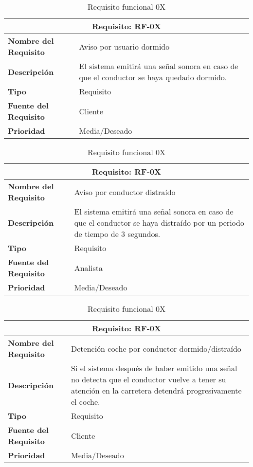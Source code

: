 \begin{table}[H]
\begin{center}
\begin{tabular}{p{} p{7cm}}
\multicolumn{2}{c}{\textbf{Requisito: RF-0X} } \\
\hline \hline
\textbf{Nombre del Requisito} & Aviso por usuario dormido\\
\hline
\textbf{Descripción} & El sistema emitirá una señal sonora en caso de que el conductor se haya quedado dormido.\\
\hline
\textbf{Tipo} & Requisito  \\
\hline
\textbf{Fuente del Requisito} & Cliente  \\
\hline
\textbf{Prioridad} & Media/Deseado  \\ \hline
\end{tabular}
\caption{Requisito funcional 0X}
\label{tab:personal}
\end{center}
\end{table}

\begin{table}[H]
\begin{center}
\begin{tabular}{p{} p{7cm}}
\multicolumn{2}{c}{\textbf{Requisito: RF-0X} } \\
\hline \hline
\textbf{Nombre del Requisito} & Aviso por conductor distraído\\
\hline
\textbf{Descripción} & El sistema emitirá una señal sonora en caso de que el conductor se haya distraído por un periodo de tiempo de 3 segundos.\\
\hline
\textbf{Tipo} & Requisito  \\
\hline
\textbf{Fuente del Requisito} & Analista  \\
\hline
\textbf{Prioridad} & Media/Deseado  \\ \hline
\end{tabular}
\caption{Requisito funcional 0X}
\label{tab:personal}
\end{center}
\end{table}

\begin{table}[H]
\begin{center}
\begin{tabular}{p{} p{7cm}}
\multicolumn{2}{c}{\textbf{Requisito: RF-0X} } \\
\hline \hline
\textbf{Nombre del Requisito} & Detención  coche por conductor dormido/distraído\\
\hline
\textbf{Descripción} &Si el sistema después de haber emitido una señal no detecta que el conductor vuelve a tener su atención en la carretera detendrá progresivamente el coche.\\
\hline
\textbf{Tipo} & Requisito  \\
\hline
\textbf{Fuente del Requisito} & Cliente  \\
\hline
\textbf{Prioridad} & Media/Deseado  \\ \hline
\end{tabular}
\caption{Requisito funcional 0X}
\label{tab:personal}
\end{center}
\end{table}

